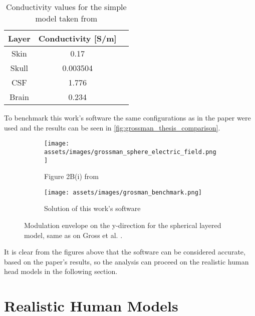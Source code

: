 \begin{table}[!ht]
\centering
\caption{Conductivity values for the simple model taken from \cite{ITstissue}}
\label{tab:grossman_conductivity_vals}
\begin{tabular}{|c|c|c|}
    \hline
    \rowcolor[HTML]{C0C0C0} 
    {\color[HTML]{000000} \textbf{Layer}} & {\color[HTML]{000000} \textbf{Conductivity {[}S/m{]}}} \\ \hline
    Skin & 0.17 \\ \hline
    Skull & 0.003504 \\ \hline
    CSF & 1.776 \\ \hline
    Brain & 0.234 \\ \hline
\end{tabular}
\end{table}

To benchmark this work's software the same configurations as in the paper were used and the results can be seen in \autoref{fig:grossman_thesis_comparison}.

\begin{figure}[H]
    \centering
    \begin{subfigure}[b]{0.49\textwidth}
        \centering
        \texttt{[image: assets/images/grossman\_sphere\_electric\_field.png]}
        \caption{Figure 2B(i) from }
        \label{fig:grossman_envelope}
    \end{subfigure}
    \begin{subfigure}[b]{0.49\textwidth}
        \centering
        \texttt{[image: assets/images/grosman\_benchmark.png]}
        \caption{Solution of this work's software}
        \label{fig:envelope_at_y_benchmark}
    \end{subfigure}
    \caption[Modulation envelope on the y-direction for the spherical layered model]{Modulation envelope on the y-direction for the spherical layered model, same as on Gross et al. \cite[Figure 2B]{Grossman2017}.}
    \label{fig:grossman_thesis_comparison}
\end{figure}

It is clear from the figures above that the software can be considered accurate, based on the paper's results, so the analysis can proceed on the realistic human head models in the following section.


\section{Realistic Human Models}
\label{sec:realistic_human_models}

